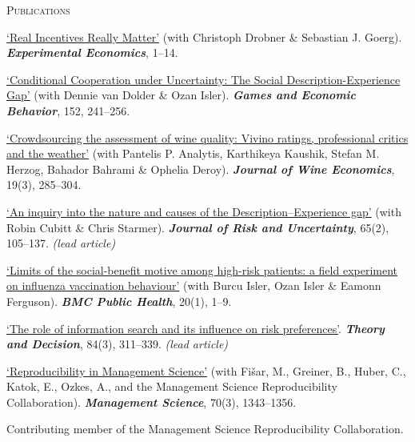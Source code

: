 \begin{rubric}{\textsc{Publications}}


\entry*[2026] \href{https://doi.org/10.1017/eec.2026.10068}{`Real Incentives Really Matter'} (with Christoph Drobner \& Sebastian J. Goerg). \textit{\textbf{Experimental Economics}}, 1--14.

\entry*[2025] \href{https://www.sciencedirect.com/science/article/pii/S0899825625000636}{`Conditional Cooperation under Uncertainty: The Social Description-Experience Gap'} (with Dennie van Dolder \&  Ozan Isler). \textit{\textbf{Games and Economic Behavior}}, 152, 241--256.

\entry*[2024] \href{https://doi.org/10.1017/jwe.2024.20}{`Crowdsourcing the assessment of wine quality: Vivino ratings, professional critics and the weather'} (with Pantelis P. Analytis, Karthikeya Kaushik, Stefan M. Herzog, Bahador Bahrami \& Ophelia Deroy). \textit{\textbf{Journal of Wine Economics}}, 19(3), 285--304.

\entry*[2022] \href{https://link.springer.com/article/10.1007/s11166-022-09393-w}{`An inquiry into the nature and causes of the Description--Experience gap'} (with Robin Cubitt \& Chris Starmer). \textit{\textbf{Journal of Risk and Uncertainty}}, 65(2), 105--137. \emph{(lead article)}

\entry*[2020] \href{https://doi.org/10.1186/s12889-020-8246-3}{`Limits of the social-benefit motive among high-risk patients: a field experiment on influenza vaccination behaviour'} (with Burcu Isler, Ozan Isler \& Eamonn Ferguson). \textit{\textbf{BMC Public Health}}, 20(1), 1--9.

\entry*[2018] \href{https://link.springer.com/article/10.1007/s11238-017-9623-y}{`The role of information search and its influence on risk preferences'}. \textit{\textbf{Theory and Decision}}, 84(3), 311--339. \emph{(lead article)}


\entry*[2024] \href{https://pubsonline.informs.org/doi/10.1287/mnsc.2023.03556}{`Reproducibility in Management Science'} (with Fi\v{s}ar, M., Greiner, B., Huber, C., Katok, E., Ozkes, A., and the Management Science Reproducibility Collaboration). \textbf{\textit{Management Science}}, 70(3), 1343--1356.
\par\footnotesize{Contributing member of the Management Science Reproducibility Collaboration.}

%
%

\end{rubric}
